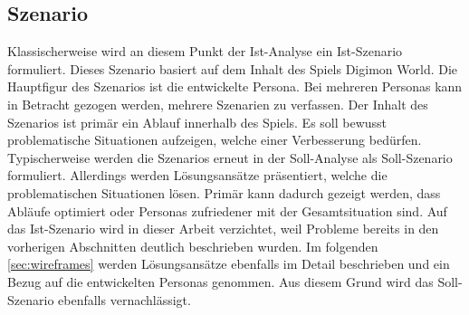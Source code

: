 \subsection{Szenario}
Klassischerweise wird an diesem Punkt der Ist-Analyse ein Ist-Szenario formuliert\cite[S. 419]{grundlagen-grochla}.
Dieses Szenario basiert auf dem Inhalt des Spiels Digimon World.
Die Hauptfigur des Szenarios ist die entwickelte Persona.
Bei mehreren Personas kann in Betracht gezogen werden, mehrere Szenarien zu verfassen.
Der Inhalt des Szenarios ist primär ein Ablauf innerhalb des Spiels.
Es soll bewusst problematische Situationen aufzeigen, welche einer Verbesserung bedürfen.
Typischerweise werden die Szenarios erneut in der Soll-Analyse als Soll-Szenario formuliert.
Allerdings werden Lösungsansätze präsentiert, welche die problematischen Situationen lösen.
Primär kann dadurch gezeigt werden, dass Abläufe optimiert oder Personas zufriedener mit der Gesamtsituation sind.
Auf das Ist-Szenario wird in dieser Arbeit verzichtet, weil Probleme bereits in den vorherigen Abschnitten deutlich beschrieben wurden.
Im folgenden \autoref{sec:wireframes} werden Lösungsansätze ebenfalls im Detail beschrieben und ein Bezug auf die entwickelten Personas genommen.
Aus diesem Grund wird das Soll-Szenario ebenfalls vernachlässigt.

